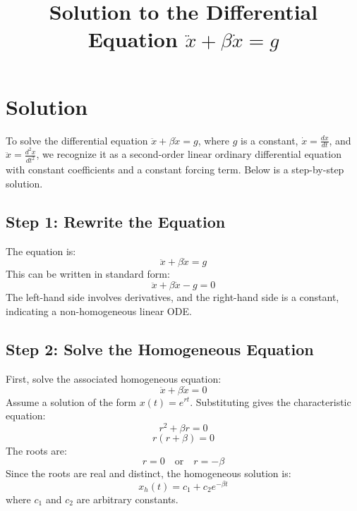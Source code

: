 \documentclass[a4paper,12pt]{article}
\begin{document}
\title{Solution to the Differential Equation \(\ddot{x} + \beta \dot{x} = g\)}
\author{}
\date{}
\maketitle

\section*{Solution}

To solve the differential equation \(\ddot{x} + \beta \dot{x} = g\), where \(g\) is a constant, \(\dot{x} = \frac{dx}{dt}\), and \(\ddot{x} = \frac{d^2x}{dt^2}\), we recognize it as a second-order linear ordinary differential equation with constant coefficients and a constant forcing term. Below is a step-by-step solution.

\subsection*{Step 1: Rewrite the Equation}
The equation is:
\begin{equation}
\ddot{x} + \beta \dot{x} = g
\end{equation}
This can be written in standard form:
\begin{equation}
\ddot{x} + \beta \dot{x} - g = 0
\end{equation}
The left-hand side involves derivatives, and the right-hand side is a constant, indicating a non-homogeneous linear ODE.

\subsection*{Step 2: Solve the Homogeneous Equation}
First, solve the associated homogeneous equation:
\begin{equation}
\ddot{x} + \beta \dot{x} = 0
\end{equation}
Assume a solution of the form \(x(t) = e^{rt}\). Substituting gives the characteristic equation:
\begin{equation}
r^2 + \beta r = 0
\end{equation}
\[
r(r + \beta) = 0
\]
The roots are:
\[
r = 0 \quad \text{or} \quad r = -\beta
\]
Since the roots are real and distinct, the homogeneous solution is:
\begin{equation}
x_h(t) = c_1 + c_2 e^{-\beta t}
\end{equation}
where \(c_1\) and \(c_2\) are arbitrary constants.
\end{document}
